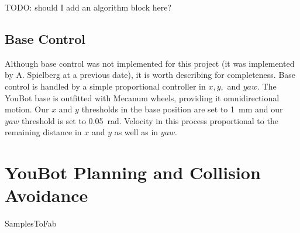 \documentclass[conference]{acmsiggraph}
\makeatletter
\def\BState{\State\hskip-\ALG@thistlm}
\makeatother
\begin{document}
TODO: should I add an algorithm block here?


\subsection{Base Control}
Although base control was not implemented for this project (it was implemented by A. Spielberg at a previous date), it is worth describing for completeness.  Base control is handled by a simple proportional controller in $x, y,$ and $yaw$.   The YouBot base is outfitted with Mecanum wheels, providing it omnidirectional motion.  Our $x$ and $y$ thresholds in the base position are set to 1~mm and our $yaw$ threshold is set to 0.05~rad.  Velocity in this process proportional to the remaining distance in $x$ and $y$ as well as in $yaw$.

\section{YouBot Planning and Collision Avoidance}

\begin{algorithm}
\caption{SamplesToFab}\label{alg:samplestofab}
\end{algorithm}
\end{document}
